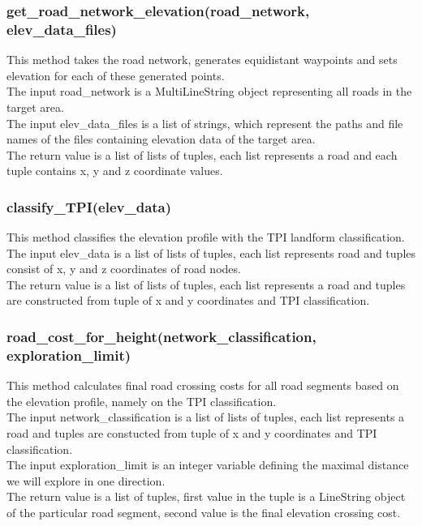 \documentclass[oneside]{article}
\begin{document}
            \subsubsection{get\_road\_network\_elevation(road\_network, elev\_data\_files)}
            This method takes the road network, generates equidistant waypoints and sets elevation for each of these generated points.\\
            The input road\_network is a MultiLineString object representing all roads in the target area.\\
            The input elev\_data\_files is a list of strings, which represent the paths and file names of the files containing elevation data of the target area.\\
            The return value is a list of lists of tuples, each list represents a road and each tuple contains x, y and z coordinate values.

            \subsubsection{classify\_TPI(elev\_data)}
            This method classifies the elevation profile with the TPI landform classification.\\
            The input elev\_data is a list of lists of tuples, each list represents road and tuples consist of x, y and z coordinates of road nodes.\\
            The return value is a list of lists of tuples, each list represents a road and tuples are constructed from tuple of x and y coordinates and TPI classification.

            \subsubsection{road\_cost\_for\_height(network\_classification, exploration\_limit)}
            This method calculates final road crossing costs for all road segments based on the elevation profile, namely on the TPI classification.\\
            The input network\_classification is a list of lists of tuples, each list represents a road and tuples are constucted from tuple of x and y coordinates and TPI classification.\\
            The input exploration\_limit is an integer variable defining the maximal distance we will explore in one direction.\\
            The return value is a list of tuples, first value in the tuple is a LineString object of the particular road segment, second value is the final elevation crossing cost.
\end{document}
